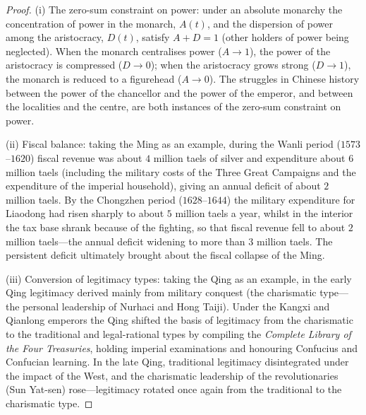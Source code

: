 \begin{proof}
(i) The zero-sum constraint on power: under an absolute monarchy the concentration of power in the monarch, $A(t)$, and the dispersion of power among the aristocracy, $D(t)$, satisfy $A + D = 1$ (other holders of power being neglected). When the monarch centralises power ($A \to 1$), the power of the aristocracy is compressed ($D \to 0$); when the aristocracy grows strong ($D \to 1$), the monarch is reduced to a figurehead ($A \to 0$). The struggles in Chinese history between the power of the chancellor and the power of the emperor, and between the localities and the centre, are both instances of the zero-sum constraint on power.

(ii) Fiscal balance: taking the Ming as an example, during the Wanli period ($1573$--$1620$) fiscal revenue was about $4$ million taels of silver and expenditure about $6$ million taels (including the military costs of the Three Great Campaigns and the expenditure of the imperial household), giving an annual deficit of about $2$ million taels. By the Chongzhen period ($1628$--$1644$) the military expenditure for Liaodong had risen sharply to about $5$ million taels a year, whilst in the interior the tax base shrank because of the fighting, so that fiscal revenue fell to about $2$ million taels---the annual deficit widening to more than $3$ million taels. The persistent deficit ultimately brought about the fiscal collapse of the Ming.

(iii) Conversion of legitimacy types: taking the Qing as an example, in the early Qing legitimacy derived mainly from military conquest (the charismatic type---the personal leadership of Nurhaci and Hong Taiji). Under the Kangxi and Qianlong emperors the Qing shifted the basis of legitimacy from the charismatic to the traditional and legal-rational types by compiling the \textit{Complete Library of the Four Treasuries}, holding imperial examinations and honouring Confucius and Confucian learning. In the late Qing, traditional legitimacy disintegrated under the impact of the West, and the charismatic leadership of the revolutionaries (Sun Yat-sen) rose---legitimacy rotated once again from the traditional to the charismatic type.
\end{proof}

